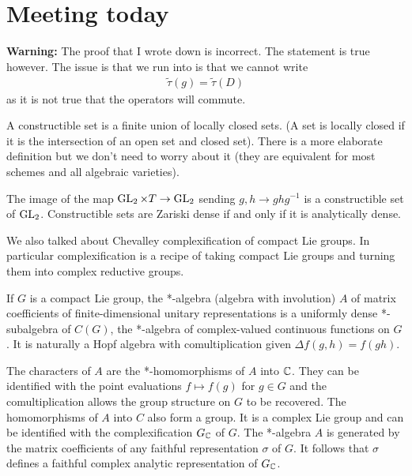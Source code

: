 \documentclass[12pt]{article}
\begin{document}
\section{Meeting today}
\begin{remark}
    \textbf{Warning:} The proof that I wrote down is incorrect. The statement is true however. The issue is that we run into is that we cannot write \begin{align*}
    \tilde\tau(g) = \tilde\tau(D)
\end{align*} as it is not true that the operators will commute. 
\end{remark}

\begin{definition}
    A constructible set is a finite union of locally closed sets. (A set is locally closed if it is the intersection of an open set and closed set). There is a more elaborate definition but we don't need to worry about it (they are equivalent for most schemes and all algebraic varieties). 
\end{definition}

\begin{fact}
    The image of the map $\operatorname{GL}_2\times T\to \operatorname{GL}_2$ sending $g,h\to ghg^{-1}$ is a constructible set of $\operatorname{GL}_2$. Constructible sets are Zariski dense if and only if it is analytically dense.
\end{fact}
We also talked about Chevalley complexification of compact Lie groups. In particular complexification is a recipe of taking compact Lie groups and turning them into complex reductive groups.

\begin{remark}
    If $G$ is a compact Lie group, the *-algebra (algebra with involution) $A$ of matrix coefficients of finite-dimensional unitary representations is a uniformly dense *-subalgebra of $C(G)$, the *-algebra of complex-valued continuous functions on $G$. It is naturally a Hopf algebra with comultiplication given $\Delta f(g,h) = f(gh)$.

    \hfill 

The characters of $A$ are the *-homomorphisms of $A$ into $\mathbb{C}$. They can be identified with the point evaluations $f\mapsto f(g)$ for $g\in G$ and the comultiplication allows the group structure on $G$ to be recovered. 
The homomorphisms of $A $ into $ C$ also form a group. It is a complex Lie group and can be identified with the complexification $G_{\mathbb{C}}$ of $G$. 
The *-algebra $A$ is generated by the matrix coefficients of any faithful representation $\sigma $ of $ G$. 
It follows that $\sigma$ defines a faithful complex analytic representation of $G_{\mathbb{C}}$.

\end{remark}
\end{document}
